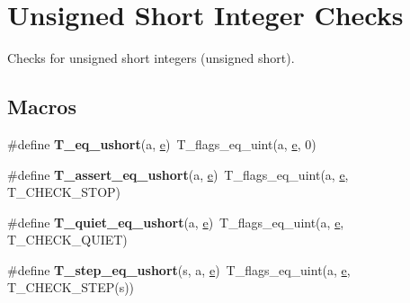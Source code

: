 \hypertarget{group__RTEMSTestFrameworkChecksUShort}{}\section{Unsigned Short Integer Checks}
\label{group__RTEMSTestFrameworkChecksUShort}


Checks for unsigned short integers (unsigned short).  


\subsection*{Macros}
\begin{DoxyCompactItemize}
\item 
\mbox{\label{group__RTEMSTestFrameworkChecksUShort_gaf5a1887f883feb089dfca7bc9c5a1b30}} 
\#define {\bfseries T\+\_\+eq\+\_\+ushort}(a,  \mbox{\hyperlink{sun4u_2tte_8h_a8b0b9ed08e0e18920ec2682f48228c27}{e}})~T\+\_\+flags\+\_\+eq\+\_\+uint(a, \mbox{\hyperlink{sun4u_2tte_8h_a8b0b9ed08e0e18920ec2682f48228c27}{e}}, 0)
\item 
\mbox{\label{group__RTEMSTestFrameworkChecksUShort_ga1d054bf19af6cd9939caad6343dba067}} 
\#define {\bfseries T\+\_\+assert\+\_\+eq\+\_\+ushort}(a,  \mbox{\hyperlink{sun4u_2tte_8h_a8b0b9ed08e0e18920ec2682f48228c27}{e}})~T\+\_\+flags\+\_\+eq\+\_\+uint(a, \mbox{\hyperlink{sun4u_2tte_8h_a8b0b9ed08e0e18920ec2682f48228c27}{e}}, T\+\_\+\+C\+H\+E\+C\+K\+\_\+\+S\+T\+OP)
\item 
\mbox{\label{group__RTEMSTestFrameworkChecksUShort_ga69ddd7c93352957fb8179339bbac9a43}} 
\#define {\bfseries T\+\_\+quiet\+\_\+eq\+\_\+ushort}(a,  \mbox{\hyperlink{sun4u_2tte_8h_a8b0b9ed08e0e18920ec2682f48228c27}{e}})~T\+\_\+flags\+\_\+eq\+\_\+uint(a, \mbox{\hyperlink{sun4u_2tte_8h_a8b0b9ed08e0e18920ec2682f48228c27}{e}}, T\+\_\+\+C\+H\+E\+C\+K\+\_\+\+Q\+U\+I\+ET)
\item 
\mbox{\label{group__RTEMSTestFrameworkChecksUShort_gab732fc725e0acda8c29a98ca2d82f1bc}} 
\#define {\bfseries T\+\_\+step\+\_\+eq\+\_\+ushort}(s,  a,  \mbox{\hyperlink{sun4u_2tte_8h_a8b0b9ed08e0e18920ec2682f48228c27}{e}})~T\+\_\+flags\+\_\+eq\+\_\+uint(a, \mbox{\hyperlink{sun4u_2tte_8h_a8b0b9ed08e0e18920ec2682f48228c27}{e}}, T\+\_\+\+C\+H\+E\+C\+K\+\_\+\+S\+T\+EP(s))

\end{DoxyCompactItemize}
